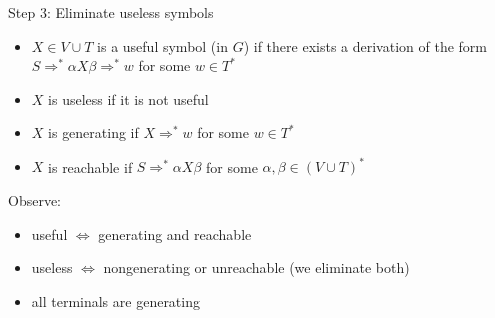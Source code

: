 \documentclass[handout]{beamer}
\begin{document}
\begin{frame}{Step 3: Eliminate useless symbols}

	\begin{itemize}
		\item $X\in V\cup T$ is a \alert{useful} symbol (in $G$) if there exists a derivation of the form $S\Rightarrow^* \alpha X \beta \Rightarrow^* w$ for some $w \in T^*$
		\item $X$ is \alert{useless} if it is not useful
		\item $X$ is \alert{generating} if $X \Rightarrow^* w$ for some  $w\in T^*$
		\item $X$ is \alert{reachable} if $S\Rightarrow^* \alpha X \beta$ for some $\alpha,\beta\in(V\cup T)^*$
	\end{itemize}

	Observe:
	\begin{itemize}
		\item useful $\Leftrightarrow$ generating and reachable

		\item useless $\Leftrightarrow$ nongenerating or unreachable (we eliminate both)
		\item all terminals are generating
	\end{itemize}

\end{frame}
\end{document}
